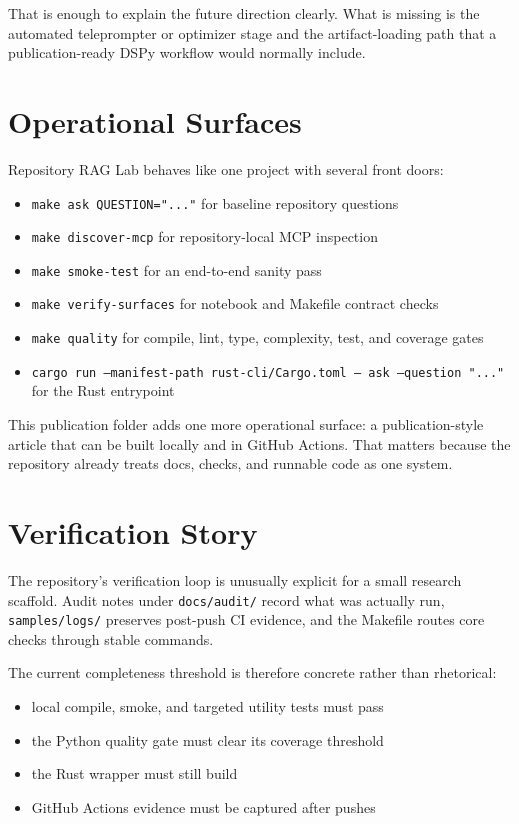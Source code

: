 \documentclass[11pt]{article}
\begin{document}
That is enough to explain the future direction clearly. What is missing is the automated
teleprompter or optimizer stage and the artifact-loading path that a publication-ready DSPy
workflow would normally include.

\section{Operational Surfaces}

Repository RAG Lab behaves like one project with several front doors:

\begin{itemize}
  \item \texttt{make ask QUESTION="..."} for baseline repository questions
  \item \texttt{make discover-mcp} for repository-local MCP inspection
  \item \texttt{make smoke-test} for an end-to-end sanity pass
  \item \texttt{make verify-surfaces} for notebook and Makefile contract checks
  \item \texttt{make quality} for compile, lint, type, complexity, test, and coverage gates
  \item \texttt{cargo run --manifest-path rust-cli/Cargo.toml -- ask --question "..."} for the Rust entrypoint
\end{itemize}

This publication folder adds one more operational surface: a publication-style article that can be
built locally and in GitHub Actions. That matters because the repository already treats docs,
checks, and runnable code as one system.

\section{Verification Story}

The repository's verification loop is unusually explicit for a small research scaffold. Audit notes
under \texttt{docs/audit/} record what was actually run, \texttt{samples/logs/} preserves post-push
CI evidence, and the Makefile routes core checks through stable commands.

The current completeness threshold is therefore concrete rather than rhetorical:

\begin{itemize}
  \item local compile, smoke, and targeted utility tests must pass
  \item the Python quality gate must clear its coverage threshold
  \item the Rust wrapper must still build
  \item GitHub Actions evidence must be captured after pushes
\end{itemize}
\end{document}
